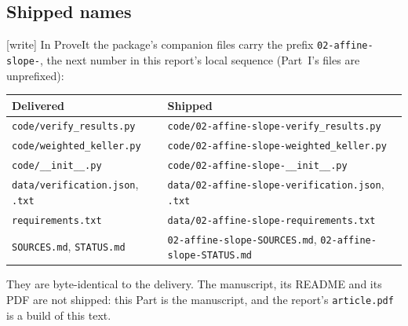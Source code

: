\documentclass[11pt,a4paper]{article}
\numberwithin{equation}{section}
\theoremstyle{definition}
\theoremstyle{remark}
\newcommand{\rpath}[1]{\nolinkurl{#1}}
\begin{document}
\subsection{Shipped names}\label{wkr:as:sec:shipped}
\textup{[write]} In ProveIt the package's companion files carry the
prefix \texttt{02-affine-slope-}, the next number in this report's local
sequence (Part~I's files are unprefixed):
\begin{center}
\small
\begin{tabular}{@{}p{}p{}@{}}
\toprule
Delivered & Shipped\\
\midrule
\rpath{code/verify_results.py} & \rpath{code/02-affine-slope-verify_results.py}\\
\rpath{code/weighted_keller.py} & \rpath{code/02-affine-slope-weighted_keller.py}\\
\rpath{code/__init__.py} & \rpath{code/02-affine-slope-__init__.py}\\
\rpath{data/verification.json}, \rpath{.txt} &
\rpath{data/02-affine-slope-verification.json}, \rpath{.txt}\\
\rpath{requirements.txt} & \rpath{data/02-affine-slope-requirements.txt}\\
\rpath{SOURCES.md}, \rpath{STATUS.md} &
\rpath{02-affine-slope-SOURCES.md}, \rpath{02-affine-slope-STATUS.md}\\
\bottomrule
\end{tabular}
\end{center}
They are byte-identical to the delivery. The manuscript, its README and
its PDF are not shipped: this Part is the manuscript, and the report's
\rpath{article.pdf} is a build of this text.
\end{document}
